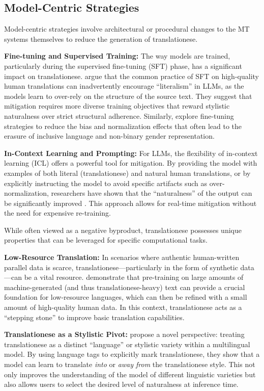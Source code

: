 \documentclass[11pt,a4paper]{article}
\begin{document}
\subsection{Model-Centric Strategies}

Model-centric strategies involve architectural or procedural changes to the MT systems themselves to reduce the generation of translationese.

\textbf{Fine-tuning and Supervised Training:} The way models are trained, particularly during the supervised fine-tuning (SFT) phase, has a significant impact on translationese. \citet{li2025lost} argue that the common practice of SFT on high-quality human translations can inadvertently encourage ``literalism'' in LLMs, as the models learn to over-rely on the structure of the source text. They suggest that mitigation requires more diverse training objectives that reward stylistic naturalness over strict structural adherence. Similarly, \citet{jourdan2025translationese} explore fine-tuning strategies to reduce the bias and normalization effects that often lead to the erasure of inclusive language and non-binary gender representation.

\textbf{In-Context Learning and Prompting:} For LLMs, the flexibility of in-context learning (ICL) offers a powerful tool for mitigation. By providing the model with examples of both literal (translationese) and natural human translations, or by explicitly instructing the model to avoid specific artifacts such as over-normalization, researchers have shown that the ``naturalness'' of the output can be significantly improved \cite{wang2024benchmarking,agrawal2023incontext}. This approach allows for real-time mitigation without the need for expensive re-training.

While often viewed as a negative byproduct, translationese possesses unique properties that can be leveraged for specific computational tasks.

\textbf{Low-Resource Translation:} In scenarios where authentic human-written parallel data is scarce, translationese—particularly in the form of synthetic data—can be a vital resource. \citet{dabre2024pretraining} demonstrate that pre-training on large amounts of machine-generated (and thus translationese-heavy) text can provide a crucial foundation for low-resource languages, which can then be refined with a small amount of high-quality human data. In this context, translationese acts as a ``stepping stone'' to improve basic translation capabilities.

\textbf{Translationese as a Stylistic Pivot:} \citet{riley2020translationese} propose a novel perspective: treating translationese as a distinct ``language'' or stylistic variety within a multilingual model. By using language tags to explicitly mark translationese, they show that a model can learn to translate \textit{into} or \textit{away from} the translationese style. This not only improves the understanding of the model of different linguistic varieties but also allows users to select the desired level of naturalness at inference time.
\end{document}
